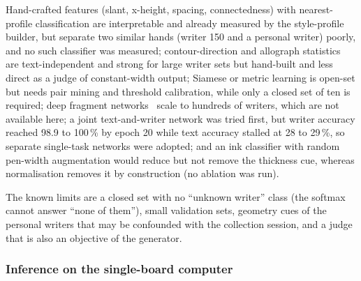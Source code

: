 Hand-crafted features (slant, x-height, spacing, connectedness) with nearest-profile classification are interpretable and already measured by the style-profile builder, but separate two similar hands (writer 150 and a personal writer) poorly, and no such classifier was measured; contour-direction and allograph statistics~\cite{bulacu2007} are text-independent and strong for large writer sets but hand-built and less direct as a judge of constant-width output; Siamese or metric learning is open-set but needs pair mining and threshold calibration, while only a closed set of ten is required; deep fragment networks~\cite{he2020} scale to hundreds of writers, which are not available here; a joint text-and-writer network was tried first, but writer accuracy reached 98.9 to 100\,\% by epoch 20 while text accuracy stalled at 28 to 29\,\%, so separate single-task networks were adopted; and an ink classifier with random pen-width augmentation would reduce but not remove the thickness cue, whereas normalisation removes it by construction (no ablation was run).

The known limits are a closed set with no ``unknown writer'' class (the softmax cannot answer ``none of them''), small validation sets, geometry cues of the personal writers that may be confounded with the collection session, and a judge that is also an objective of the generator.

\subsubsection{Inference on the single-board computer}

